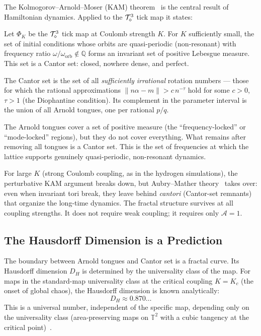 The Kolmogorov--Arnold--Moser (KAM) theorem~\cite{kolmogorov1954,
arnold1963, moser1962} is the central result of Hamiltonian dynamics.
Applied to the $\mathcal{T}_\diamond^3$ tick map it states:

\begin{theorem}
\label{thm:kam}
Let $\Phi_K$ be the $\mathcal{T}_\diamond^3$ tick map at Coulomb strength $K$.
For $K$ sufficiently small, the set of initial conditions whose
orbits are quasi-periodic (non-resonant) with frequency ratio
$\omega/\omega_{\mathrm{orb}} \notin \mathbb{Q}$ forms an invariant
set of positive Lebesgue measure.
This set is a Cantor set: closed, nowhere dense, and perfect.
\end{theorem}

The Cantor set is the set of all \emph{sufficiently irrational}
rotation numbers --- those for which the rational approximations
$\|n\alpha - m\| > c\,n^{-\tau}$ hold for some $c > 0$,
$\tau > 1$ (the Diophantine condition).
Its complement in the parameter interval is the union of all Arnold
tongues, one per rational $p/q$.

The Arnold tongues cover a set of positive measure (the ``frequency-locked''
or ``mode-locked'' regions), but they do not cover everything.
What remains after removing all tongues is a Cantor set.
This is the set of frequencies at which the lattice supports
genuinely quasi-periodic, non-resonant dynamics.

For large $K$ (strong Coulomb coupling, as in the hydrogen simulations),
the perturbative KAM argument breaks down, but Aubry--Mather
theory~\cite{aubry1983, mather1982} takes over: even when invariant tori
break, they leave behind \emph{cantori} (Cantor-set remnants) that
organize the long-time dynamics.
The fractal structure survives at all coupling strengths.
It does not require weak coupling; it requires only $\mathcal{A}=1$.

\subsection{The Hausdorff Dimension is a Prediction}
\label{subsec:hausdorff}

The boundary between Arnold tongues and Cantor set is a fractal curve.
Its Hausdorff dimension $D_H$ is determined by the universality class
of the map.
For maps in the standard-map universality class at the critical coupling
$K = K_c$ (the onset of global chaos), the Hausdorff dimension is
known analytically:
\begin{equation}
    D_H \approx 0.870\ldots
    \label{eq:hausdorff}
\end{equation}
This is a universal number, independent of the specific map, depending
only on the universality class (area-preserving maps on $\mathbb{T}^2$
with a cubic tangency at the critical point)~\cite{mackay1983}.

